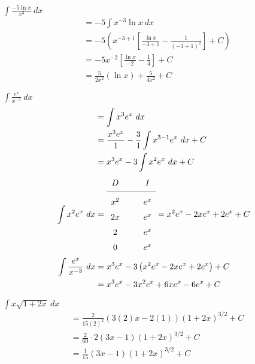 \documentclass[12pt]{article}
\newenvironment{problem}[2][]{
    \begin{trivlist}
        \item[
            {\bfseries #1}
            {\bfseries #2.}
        ]
}{\end{trivlist}}
\newcommand{\tikzmark}[1]{%
    \tikz[overlay, remember picture, baseline] \node (#1) {};%
}
\begin{document}
\begin{problem}{25}
$\displaystyle\int \frac{-5 \ln x}{x^3} ~ dx$
\begin{align}
&= -5 \int x^{-3} \ln x ~ dx \\
&= -5 \left(x^{-3 + 1} \left[\frac{\ln x}{-3 + 1} - \frac{1}{\left(-3 + 1\right)^2}\right] + C\right) \\
&= -5x^{-2} \left[\frac{\ln x}{-2} - \frac{1}{4}\right] + C \\
&= \frac{5}{2x^2} \left(\ln x\right) + \frac{5}{4x^2} + C
\end{align}
\end{problem}

\begin{problem}{27}
$\displaystyle\int \frac{e^x}{x^{-3}} ~ dx$
\begin{align}
&= \int x^3 e^x ~ dx \\
&= \frac{x^3 e^x}{1} - \frac{3}{1} \int x^{3-1} e^x ~ dx + C \\
&= x^3 e^x - 3 \int x^2 e^x ~ dx + C \\
\int x^{2} e^x ~ dx &=
\renewcommand{\arraystretch}{1.5}
\begin{array}{c @{\hspace*{1.0cm}} c}
D & I \\
\cmidrule{1-2}
x^2\tikzmark{D1} & \tikzmark{I1}e^x \\
2x \tikzmark{D2} & \tikzmark{I2}e^{x} \\      
2 \tikzmark{D3} & \tikzmark{I3}e^{x} \\      
0 \tikzmark{D4} & \tikzmark{I4}e^{x}
\end{array} = x^2 e^x - 2x e^x + 2e^x + C \\
\int \frac{e^x}{x^{-3}} ~ dx &= x^3 e^x - 3 \left(x^2 e^x - 2xe^x + 2e^x\right) + C \\
&= x^3 e^x - 3x^2 e^x + 6x e^x - 6e^x + C
\end{align}
\end{problem}

\begin{problem}{29}
$\displaystyle\int x \sqrt{1 + 2x} ~ dx$
\begin{align}
&= \frac{2}{15\left(2\right)^2} \left(3\left(2\right)x - 2\left(1\right)\right)\left(1 + 2x\right)^{3/2} + C \\
&= \frac{2}{60} \cdot 2 \left(3x - 1\right)\left(1 + 2x\right)^{3/2} + C \\
&= \frac{1}{15} \left(3x - 1\right)\left(1 + 2x\right)^{3/2} + C
\end{align}
\end{problem}
\end{document}
